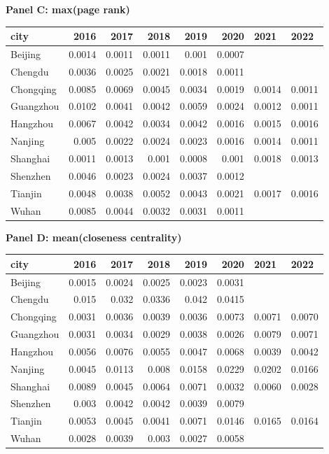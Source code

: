 \textbf{Panel C: max(page rank)}\\
\begin{tabular}{lrrrrrll}
\hline
 city      &   2016 &   2017 &   2018 &   2019 &   2020 & 2021   & 2022   \\
\hline
 Beijing   & 0.0014 & 0.0011 & 0.0011 & 0.001  & 0.0007 &        &        \\
 Chengdu   & 0.0036 & 0.0025 & 0.0021 & 0.0018 & 0.0011 &        &        \\
 Chongqing & 0.0085 & 0.0069 & 0.0045 & 0.0034 & 0.0019 & 0.0014 & 0.0011 \\
 Guangzhou & 0.0102 & 0.0041 & 0.0042 & 0.0059 & 0.0024 & 0.0012 & 0.0011 \\
 Hangzhou  & 0.0067 & 0.0042 & 0.0034 & 0.0042 & 0.0016 & 0.0015 & 0.0016 \\
 Nanjing   & 0.005  & 0.0022 & 0.0024 & 0.0023 & 0.0016 & 0.0014 & 0.0011 \\
 Shanghai  & 0.0011 & 0.0013 & 0.001  & 0.0008 & 0.001  & 0.0018 & 0.0013 \\
 Shenzhen  & 0.0046 & 0.0023 & 0.0024 & 0.0037 & 0.0012 &        &        \\
 Tianjin   & 0.0048 & 0.0038 & 0.0052 & 0.0043 & 0.0021 & 0.0017 & 0.0016 \\
 Wuhan     & 0.0085 & 0.0044 & 0.0032 & 0.0031 & 0.0011 &        &        \\
\hline
\end{tabular}

\textbf{Panel D: mean(closeness centrality)}\\
\begin{tabular}{lrrrrrll}
\hline
 city      &   2016 &   2017 &   2018 &   2019 &   2020 & 2021   & 2022   \\
\hline
 Beijing   & 0.0015 & 0.0024 & 0.0025 & 0.0023 & 0.0031 &        &        \\
 Chengdu   & 0.015  & 0.032  & 0.0336 & 0.042  & 0.0415 &        &        \\
 Chongqing & 0.0031 & 0.0036 & 0.0039 & 0.0036 & 0.0073 & 0.0071 & 0.0070 \\
 Guangzhou & 0.0031 & 0.0034 & 0.0029 & 0.0038 & 0.0026 & 0.0079 & 0.0071 \\
 Hangzhou  & 0.0056 & 0.0076 & 0.0055 & 0.0047 & 0.0068 & 0.0039 & 0.0042 \\
 Nanjing   & 0.0045 & 0.0113 & 0.008  & 0.0158 & 0.0229 & 0.0202 & 0.0166 \\
 Shanghai  & 0.0089 & 0.0045 & 0.0064 & 0.0071 & 0.0032 & 0.0060 & 0.0028 \\
 Shenzhen  & 0.003  & 0.0042 & 0.0042 & 0.0039 & 0.0079 &        &        \\
 Tianjin   & 0.0053 & 0.0045 & 0.0041 & 0.0071 & 0.0146 & 0.0165 & 0.0164 \\
 Wuhan     & 0.0028 & 0.0039 & 0.003  & 0.0027 & 0.0058 &        &        \\
\hline
\end{tabular}

